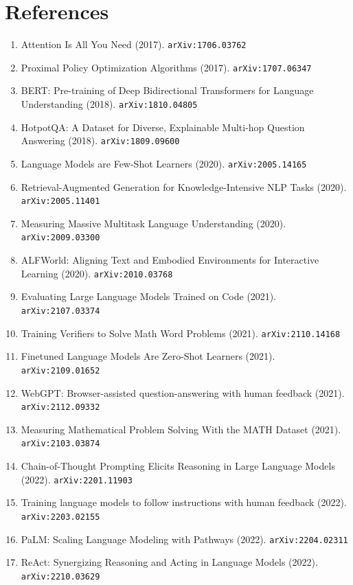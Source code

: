 \documentclass[11pt]{article}
\begin{document}
\section*{References}
\begin{enumerate}\small
  \item Attention Is All You Need (2017). \texttt{arXiv:1706.03762}
  \item Proximal Policy Optimization Algorithms (2017). \texttt{arXiv:1707.06347}
  \item BERT: Pre-training of Deep Bidirectional Transformers for Language
  Understanding (2018). \texttt{arXiv:1810.04805}
  \item HotpotQA: A Dataset for Diverse, Explainable Multi-hop Question
  Answering (2018). \texttt{arXiv:1809.09600}
  \item Language Models are Few-Shot Learners (2020). \texttt{arXiv:2005.14165}
  \item Retrieval-Augmented Generation for Knowledge-Intensive NLP Tasks (2020). \texttt{arXiv:2005.11401}
  \item Measuring Massive Multitask Language Understanding (2020). \texttt{arXiv:2009.03300}
  \item ALFWorld: Aligning Text and Embodied Environments for Interactive
  Learning (2020). \texttt{arXiv:2010.03768}
  \item Evaluating Large Language Models Trained on Code (2021). \texttt{arXiv:2107.03374}
  \item Training Verifiers to Solve Math Word Problems (2021). \texttt{arXiv:2110.14168}
  \item Finetuned Language Models Are Zero-Shot Learners (2021). \texttt{arXiv:2109.01652}
  \item WebGPT: Browser-assisted question-answering with human feedback (2021). \texttt{arXiv:2112.09332}
  \item Measuring Mathematical Problem Solving With the MATH Dataset (2021). \texttt{arXiv:2103.03874}
  \item Chain-of-Thought Prompting Elicits Reasoning in Large Language Models (2022). \texttt{arXiv:2201.11903}
  \item Training language models to follow instructions with human feedback (2022). \texttt{arXiv:2203.02155}
  \item PaLM: Scaling Language Modeling with Pathways (2022). \texttt{arXiv:2204.02311}
  \item ReAct: Synergizing Reasoning and Acting in Language Models (2022). \texttt{arXiv:2210.03629}

\end{enumerate}
\end{document}
